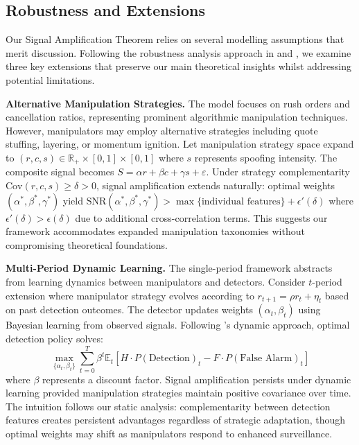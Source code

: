 \documentclass[12pt]{article}
\newcommand{\E}{\mathbb{E}}
\begin{document}
\subsection{Robustness and Extensions}

Our Signal Amplification Theorem relies on several modelling assumptions that merit discussion. Following the robustness analysis approach in \citet{bo2023optimal} and \citet{liu2024asset}, we examine three key extensions that preserve our main theoretical insights whilst addressing potential limitations.

\textbf{Alternative Manipulation Strategies.} The model focuses on rush orders and cancellation ratios, representing prominent algorithmic manipulation techniques. However, manipulators may employ alternative strategies including quote stuffing, layering, or momentum ignition. Let manipulation strategy space expand to $(r, c, s) \in \mathbb{R}_+ \times [0,1] \times [0,1]$ where $s$ represents spoofing intensity. The composite signal becomes $S = \alpha r + \beta c + \gamma s + \varepsilon$. Under strategy complementarity $\text{Cov}(r,c,s) \geq \delta > 0$, signal amplification extends naturally: optimal weights $(\alpha^*, \beta^*, \gamma^*)$ yield $\text{SNR}(\alpha^*, \beta^*, \gamma^*) > \max\{\text{individual features}\} + \epsilon'(\delta)$ where $\epsilon'(\delta) > \epsilon(\delta)$ due to additional cross-correlation terms. This suggests our framework accommodates expanded manipulation taxonomies without compromising theoretical foundations.

\textbf{Multi-Period Dynamic Learning.} The single-period framework abstracts from learning dynamics between manipulators and detectors. Consider $t$-period extension where manipulator strategy evolves according to $r_{t+1} = \rho r_t + \eta_t$ based on past detection outcomes. The detector updates weights $(\alpha_t, \beta_t)$ using Bayesian learning from observed signals. Following \citet{bo2023optimal}'s dynamic approach, optimal detection policy solves:
\begin{equation}
\max_{\{\alpha_t, \beta_t\}} \sum_{t=0}^T \beta^t \E_t[H \cdot P(\text{Detection})_t - F \cdot P(\text{False Alarm})_t]
\end{equation}
where $\beta$ represents a discount factor. Signal amplification persists under dynamic learning provided manipulation strategies maintain positive covariance over time. The intuition follows our static analysis: complementarity between detection features creates persistent advantages regardless of strategic adaptation, though optimal weights may shift as manipulators respond to enhanced surveillance.
\end{document}
